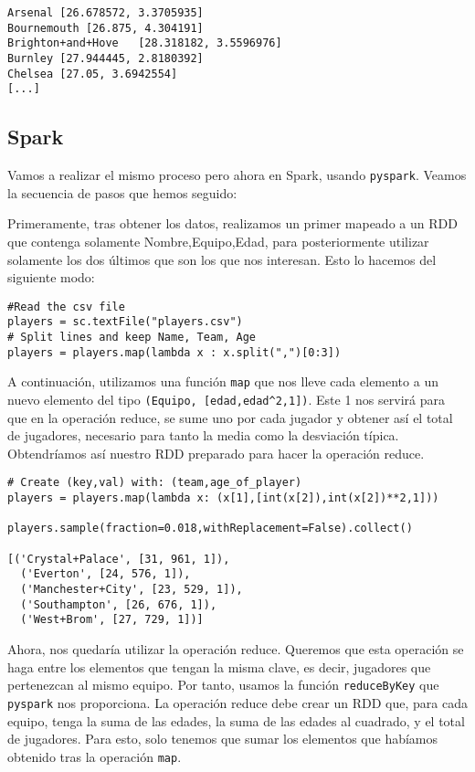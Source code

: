 \documentclass[11pt]{article}
\def\inline{\lstinline[basicstyle=\ttfamily,keywordstyle={}]}
\begin{document}
\begin{verbatim}
Arsenal	[26.678572, 3.3705935]
Bournemouth	[26.875, 4.304191]
Brighton+and+Hove	[28.318182, 3.5596976]
Burnley	[27.944445, 2.8180392]
Chelsea	[27.05, 3.6942554]
[...]
\end{verbatim}

\subsection{Spark}

Vamos a realizar el mismo proceso pero ahora en Spark, usando \inline{pyspark}. Veamos la secuencia de pasos que hemos seguido:

Primeramente, tras obtener los datos, realizamos un primer mapeado a un RDD que contenga solamente Nombre,Equipo,Edad, para posteriormente utilizar solamente los dos últimos que son los que nos interesan. Esto lo hacemos del siguiente modo:

\begin{verbatim}
#Read the csv file
players = sc.textFile("players.csv")
# Split lines and keep Name, Team, Age
players = players.map(lambda x : x.split(",")[0:3])
\end{verbatim}

A continuación, utilizamos una función \inline{map} que nos lleve cada elemento a un nuevo elemento del tipo \inline{(Equipo, [edad,edad^2,1])}. Este 1 nos servirá para que en la operación reduce, se sume uno por cada jugador y obtener así el total de jugadores, necesario para tanto la media como la desviación típica. Obtendríamos así nuestro RDD preparado para hacer la operación reduce.

\begin{verbatim}
# Create (key,val) with: (team,age_of_player)
players = players.map(lambda x: (x[1],[int(x[2]),int(x[2])**2,1]))

players.sample(fraction=0.018,withReplacement=False).collect()

[('Crystal+Palace', [31, 961, 1]),
  ('Everton', [24, 576, 1]),
  ('Manchester+City', [23, 529, 1]),
  ('Southampton', [26, 676, 1]),
  ('West+Brom', [27, 729, 1])]
\end{verbatim}

Ahora, nos quedaría utilizar la operación reduce. Queremos que esta operación se haga entre los elementos que tengan la misma clave, es decir, jugadores que pertenezcan al mismo equipo. Por tanto, usamos la función \inline{reduceByKey} que \inline{pyspark} nos proporciona. La operación reduce debe crear un RDD que, para cada equipo, tenga la suma de las edades, la suma de las edades al cuadrado, y el total de jugadores. Para esto, solo tenemos que sumar los elementos que habíamos obtenido tras la operación \inline{map}.
\end{document}

